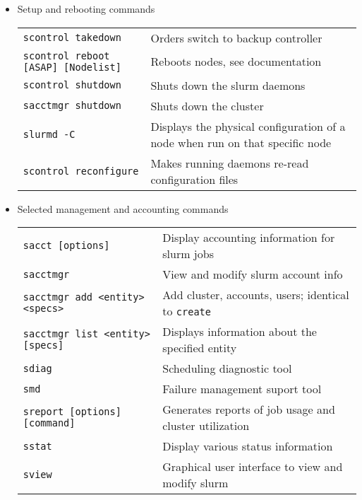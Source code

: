 \begin{itemize}
\item Setup and rebooting commands \\
\begin{tabular}{l p{3.4in}}
\texttt{scontrol takedown} & Orders switch to backup controller \\
\texttt{scontrol reboot [ASAP] [Nodelist]} & Reboots nodes, see documentation \\
\texttt{scontrol shutdown} & Shuts down the slurm daemons \\
\texttt{sacctmgr shutdown} & Shuts down the cluster \\
\texttt{slurmd -C} & Displays the physical configuration of a node when run on that specific node \\
\texttt{scontrol reconfigure} & Makes running daemons re-read configuration files \\
\end{tabular}

\item Selected management and accounting commands \\
\begin{tabular}{l p{3.4in}}
\texttt{sacct [options]} & Display accounting information for slurm jobs \\
\texttt{sacctmgr} & View and modify slurm account info \\
\texttt{sacctmgr add <entity> <specs>} & Add cluster, accounts, users; identical to \texttt{create} \\
\texttt{sacctmgr list <entity> [specs]} & Displays information about the specified entity\\
\texttt{sdiag} & Scheduling diagnostic tool \\
\texttt{smd} & Failure management suport tool \\
\texttt{sreport [options] [command]} & Generates reports of job usage and cluster utilization \\
\texttt{sstat} & Display various status information \\
\texttt{sview} & Graphical user interface to view and modify slurm \\
\end{tabular}



\end{itemize}
